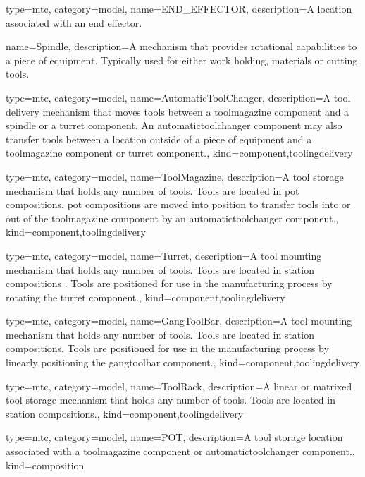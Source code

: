 {
  type=mtc,
  category=model,
  name={END\_EFFECTOR},
  description={A location associated with an end effector.}
}

{
  name={Spindle},
  description={A mechanism that provides rotational capabilities to a piece of equipment. 
  \newline Typically used for either work holding, materials or cutting tools.}
}

{
  type=mtc,
  category=model,
  name={AutomaticToolChanger},
  description={A tool delivery mechanism that moves tools between a \gls{toolmagazine component} and a \gls{spindle} or a \gls{turret component}. An \gls{automatictoolchanger component} may also transfer tools between a location outside of a piece of equipment and a \gls{toolmagazine component} or \gls{turret component}.},
  kind={component,toolingdelivery}
}

{
  type=mtc,
  category=model,
  name={ToolMagazine},
  description={A tool storage mechanism that holds any number of tools. Tools are located in \gls{pot composition}s. \gls{pot composition}s are moved into position to transfer tools into or out of the \gls{toolmagazine component} by an \gls{automatictoolchanger component}.},
  kind={component,toolingdelivery}
}

{
  type=mtc,
  category=model,
  name={Turret},
  description={A tool mounting mechanism that holds any number of tools. Tools are located in \gls{station composition}s . Tools are positioned for use in the manufacturing process by rotating the \gls{turret component}.},
  kind={component,toolingdelivery}
}

{
  type=mtc,
  category=model,
  name={GangToolBar},
  description={A tool mounting mechanism that holds any number of tools. Tools are located in \gls{station composition}s. Tools are positioned for use in the manufacturing process by linearly positioning the \gls{gangtoolbar component}.},
  kind={component,toolingdelivery}
}

{
  type=mtc,
  category=model,
  name={ToolRack},
  description={A linear or matrixed tool storage mechanism that holds any number of tools. Tools are located in \gls{station composition}s.},
  kind={component,toolingdelivery}
}

{
  type=mtc,
  category=model,
  name={POT},
  description={A tool storage location associated with a \gls{toolmagazine component} or \gls{automatictoolchanger component}.},
  kind={composition}
}


